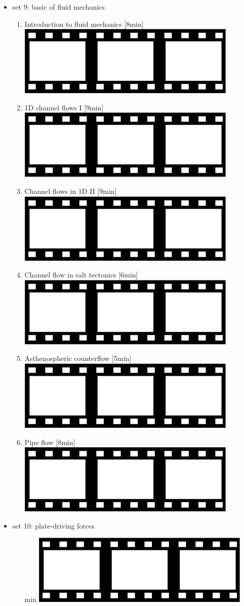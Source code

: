 \begin{itemize}
\item set 9: basic of fluid mechanics
\begin{enumerate}
\item Introduction to fluid mechanics [8min] \href{https://youtu.be/chfFH0zyZLo?si=KvBc5leSQJOWWfUV}{\includegraphics[width=.8cm]{images/pictograms/film.png}}
\item 1D channel flows I [9min] \href{https://youtu.be/iVK4rlePwGk?si=6RIyTptnoz8AZTfv}{\includegraphics[width=.8cm]{images/pictograms/film.png}}
\item Channel flows in 1D II [9min] \href{https://youtu.be/E8Ey5CjmKmk?si=6OsbkenChkX2kqI7}{\includegraphics[width=.8cm]{images/pictograms/film.png}}
\item Channel flow in salt tectonics [6min] \href{https://youtu.be/ODls5JKrR08?si=up7LAXKz-RbnTqee}{\includegraphics[width=.8cm]{images/pictograms/film.png}}
\item Asthenospheric counterflow [5min] \href{https://youtu.be/JMWfBuNfFEg?si=ETuaX6SYD5hZlnMl}{\includegraphics[width=.8cm]{images/pictograms/film.png}}
\item Pipe flow [8min] \href{https://youtu.be/Ehvmp54n0Xg?si=JyfcmES1UVATIEBi}{\includegraphics[width=.8cm]{images/pictograms/film.png}}
\end{enumerate}

\item set 10: plate-driving forces
\begin{enumerate}
\item [min] \href{}{\includegraphics[width=.8cm]{images/pictograms/film.png}}
\end{enumerate}


\end{itemize}
